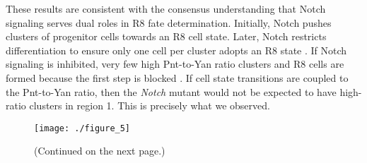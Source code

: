 These results are consistent with the consensus understanding that Notch signaling serves dual roles in R8 fate determination. Initially, Notch pushes clusters of progenitor cells towards an R8 cell state. Later, Notch restricts differentiation to ensure only one cell per cluster adopts an R8 state \cite{Baker1997,Li2001,Lubensky2011}. If Notch signaling is inhibited, very few high Pnt-to-Yan ratio clusters and R8 cells are formed because the first step is blocked \cite{Baker1997}. If cell state transitions are coupled to the Pnt-to-Yan ratio, then the \textit{Notch} mutant would not be expected to have high-ratio clusters in region 1. This is precisely what we observed.

\begin{figure}[h!]
\centering
\texttt{[image: ./figure\_5]}
\caption[Notch signaling lowers the Pnt-to-Yan ratio in progenitor cells.]{ (Continued on the next page.) }
\label{fig:ratio:fig5}
\end{figure}
